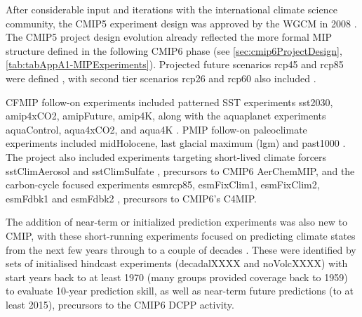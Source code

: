 \documentclass[manuscript]{copernicus}
\newcommand{\mycomment}[1]{}
\begin{document}
After considerable input and iterations with the international climate science community, the CMIP5 experiment design was approved by the WGCM in 2008 \citep{taylor_overview_2012}. The CMIP5 project design evolution already reflected the more formal MIP structure defined in the following CMIP6 phase (see \autoref{sec:cmip6ProjectDesign}, \autoref{tab:tabAppA1-MIPExperiments}). Projected future scenarios rcp45 and rcp85 were defined \citep{stouffer_cmip5_2011}, with second tier scenarios rcp26 and rcp60 also included \citep[precursors to CMIP6 ScenarioMIP experiments;][]{hibbard_primer_2011}.

CFMIP follow-on experiments included patterned SST experiments sst2030, amip4xCO2, amipFuture, amip4K, along with the aquaplanet experiments aquaControl, aqua4xCO2, and aqua4K \citep{bony_cfmip_2011}. PMIP follow-on paleoclimate experiments included midHolocene, last glacial maximum (lgm) and past1000 \citep{braconnot_paleoclimate_2011}. The project also included experiments targeting short-lived climate forcers sstClimAerosol and sstClimSulfate \citep{boucher_climate_2011}, precursors to CMIP6 AerChemMIP, and the carbon-cycle focused experiments esmrcp85, esmFixClim1, esmFixClim2, esmFdbk1 and esmFdbk2 \citep{friedlingstein_climate-carbon_2011}, precursors to CMIP6's C4MIP.

The addition of near-term or initialized prediction experiments was also new to CMIP, with these short-running experiments focused on predicting climate states from the next few years through to a couple of decades \citep{meehl_decadal_2009,doblas-reyes_cmip5_2011}. These were identified by sets of initialised hindcast experiments (decadalXXXX and noVolcXXXX) with start years back to at least 1970 (many groups provided coverage back to 1959) to evaluate 10-year prediction skill, as well as near-term future predictions (to at least 2015), precursors to the CMIP6 DCPP activity.

\mycomment{
Map CMIP5 experiments to CMIP6 MIPs
https://github.com/PCMDI/CMIP5_CVs/blob/main/src/writeJson.py
https://docs.google.com/document/d/1bUwK6G_fVZO53UjLZbQUOuBP47PsT8lqKKhL1pjRnKg/edit
}
\end{document}

